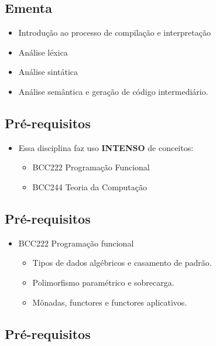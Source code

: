 \documentclass[11pt]{article}
\begin{document}
\subsection*{Ementa}
\label{sec:org62f3205}

\begin{itemize}
\item Introdução ao processo de compilação e interpretação

\item Análise léxica

\item Análise sintática

\item Análise semântica e geração de código intermediário.
\end{itemize}
\subsection*{Pré-requisitos}
\label{sec:org632eb8e}

\begin{itemize}
\item Essa disciplina faz uso \textbf{\textbf{INTENSO}} de conceitos:
\begin{itemize}
\item BCC222 Programação Funcional
\item BCC244 Teoria da Computação
\end{itemize}
\end{itemize}
\subsection*{Pré-requisitos}
\label{sec:org230940b}

\begin{itemize}
\item BCC222 Programação funcional
\begin{itemize}
\item Tipos de dados algébricos e casamento de padrão.
\item Polimorfismo paramétrico e sobrecarga.
\item Mônadas, functores e functores aplicativos.
\end{itemize}
\end{itemize}
\subsection*{Pré-requisitos}
\label{sec:orgf20f26d}
\end{document}
